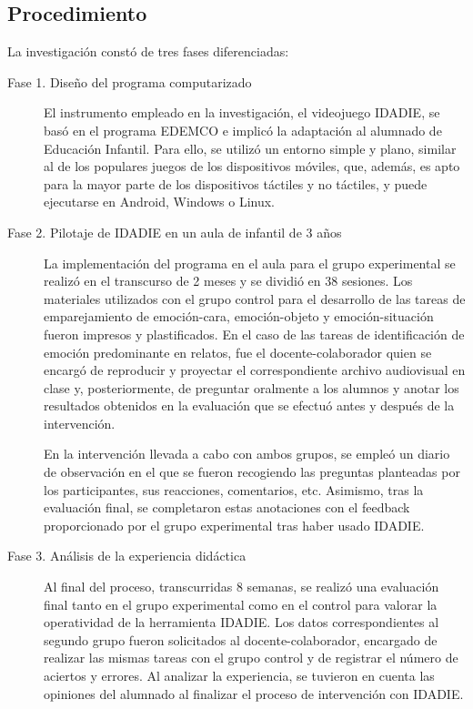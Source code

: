 \documentclass[spanish]{textolivre}
\begin{document}
\subsection{Procedimiento}\label{sec-formato}
La investigación constó de tres fases diferenciadas: 
\begin{description}
\item[Fase 1. Diseño del programa computarizado] El instrumento empleado en la investigación, el videojuego IDADIE, se basó en el programa EDEMCO e implicó la adaptación al alumnado de Educación Infantil. Para ello, se utilizó un entorno simple y plano, similar al de los populares juegos de los dispositivos móviles, que, además, es apto para la mayor parte de los dispositivos táctiles y no táctiles, y puede ejecutarse en Android, Windows o Linux. 
\item[Fase 2. Pilotaje de IDADIE en un aula de infantil de 3 años] La implementación del programa en el aula para el grupo experimental se realizó en el transcurso de 2 meses y se dividió en 38 sesiones. Los materiales utilizados con el grupo control para el desarrollo de las tareas de emparejamiento de emoción-cara, emoción-objeto y emoción-situación fueron impresos y plastificados. En el caso de las tareas de identificación de emoción predominante en relatos, fue el docente-colaborador quien se encargó de reproducir y proyectar el correspondiente archivo audiovisual en clase y, posteriormente, de preguntar oralmente a los alumnos y anotar los resultados obtenidos en la evaluación que se efectuó antes y después de la intervención. 

En la intervención llevada a cabo con ambos grupos, se empleó un diario de observación en el que se fueron recogiendo las preguntas planteadas por los participantes, sus reacciones, comentarios, etc. Asimismo, tras la evaluación final, se completaron estas anotaciones con el feedback proporcionado por el grupo experimental tras haber usado IDADIE.

\item[Fase 3. Análisis de la experiencia didáctica] Al final del proceso, transcurridas 8 semanas, se realizó una evaluación final tanto en el grupo experimental como en el control para valorar la operatividad de la herramienta IDADIE. Los datos correspondientes al segundo grupo fueron solicitados al docente-colaborador, encargado de realizar las mismas tareas con el grupo control y de registrar el número de aciertos y errores. Al analizar la experiencia, se tuvieron en cuenta las opiniones del alumnado al finalizar el proceso de intervención con IDADIE.
\end{description}
\end{document}
